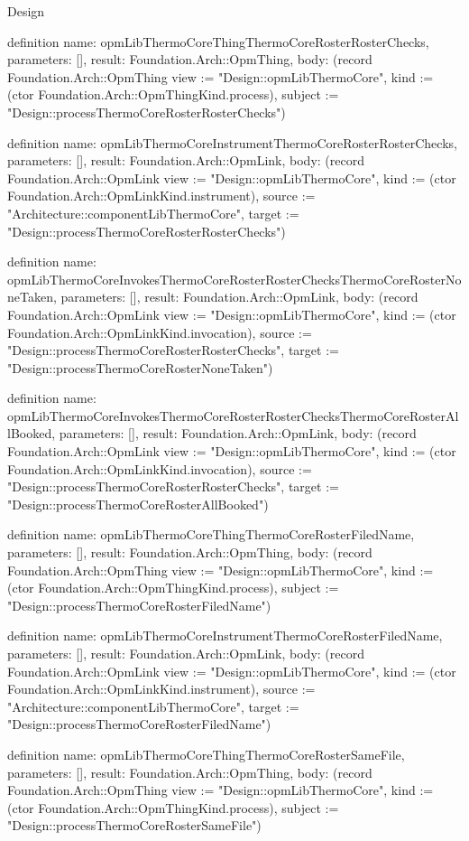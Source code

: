 \begin{lexlean}{Design}
\begin{semanticmodule}
definition{
  name: opmLibThermoCoreThingThermoCoreRosterRosterChecks,
  parameters: [],
  result: Foundation.Arch::OpmThing,
  body: (record Foundation.Arch::OpmThing {view := "Design::opmLibThermoCore", kind := (ctor Foundation.Arch::OpmThingKind.process), subject := "Design::processThermoCoreRosterRosterChecks"})
}

definition{
  name: opmLibThermoCoreInstrumentThermoCoreRosterRosterChecks,
  parameters: [],
  result: Foundation.Arch::OpmLink,
  body: (record Foundation.Arch::OpmLink {view := "Design::opmLibThermoCore", kind := (ctor Foundation.Arch::OpmLinkKind.instrument), source := "Architecture::componentLibThermoCore", target := "Design::processThermoCoreRosterRosterChecks"})
}

definition{
  name: opmLibThermoCoreInvokesThermoCoreRosterRosterChecksThermoCoreRosterNoneTaken,
  parameters: [],
  result: Foundation.Arch::OpmLink,
  body: (record Foundation.Arch::OpmLink {view := "Design::opmLibThermoCore", kind := (ctor Foundation.Arch::OpmLinkKind.invocation), source := "Design::processThermoCoreRosterRosterChecks", target := "Design::processThermoCoreRosterNoneTaken"})
}

definition{
  name: opmLibThermoCoreInvokesThermoCoreRosterRosterChecksThermoCoreRosterAllBooked,
  parameters: [],
  result: Foundation.Arch::OpmLink,
  body: (record Foundation.Arch::OpmLink {view := "Design::opmLibThermoCore", kind := (ctor Foundation.Arch::OpmLinkKind.invocation), source := "Design::processThermoCoreRosterRosterChecks", target := "Design::processThermoCoreRosterAllBooked"})
}

definition{
  name: opmLibThermoCoreThingThermoCoreRosterFiledName,
  parameters: [],
  result: Foundation.Arch::OpmThing,
  body: (record Foundation.Arch::OpmThing {view := "Design::opmLibThermoCore", kind := (ctor Foundation.Arch::OpmThingKind.process), subject := "Design::processThermoCoreRosterFiledName"})
}

definition{
  name: opmLibThermoCoreInstrumentThermoCoreRosterFiledName,
  parameters: [],
  result: Foundation.Arch::OpmLink,
  body: (record Foundation.Arch::OpmLink {view := "Design::opmLibThermoCore", kind := (ctor Foundation.Arch::OpmLinkKind.instrument), source := "Architecture::componentLibThermoCore", target := "Design::processThermoCoreRosterFiledName"})
}

definition{
  name: opmLibThermoCoreThingThermoCoreRosterSameFile,
  parameters: [],
  result: Foundation.Arch::OpmThing,
  body: (record Foundation.Arch::OpmThing {view := "Design::opmLibThermoCore", kind := (ctor Foundation.Arch::OpmThingKind.process), subject := "Design::processThermoCoreRosterSameFile"})
}


\end{semanticmodule}
\end{lexlean}
